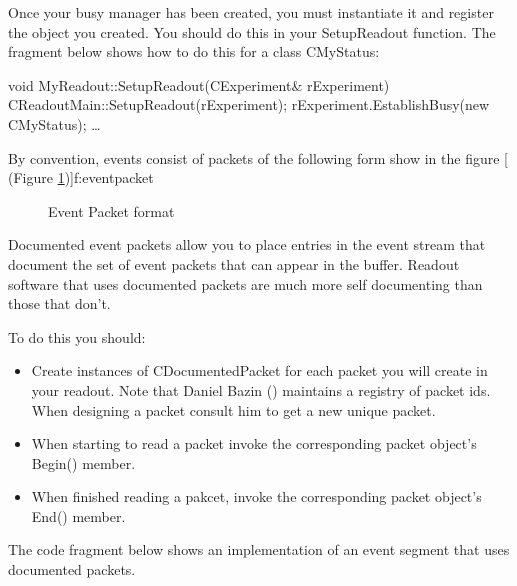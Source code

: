       Once your busy manager has been created, you must
      instantiate it and register the object you created.
      You should do this in your SetupReadout function.  The
      fragment below shows how to do this for a class
      CMyStatus:
      \begin{example}
      void
      MyReadout::SetupReadout(CExperiment\& rExperiment)
      {
	 CReadoutMain::SetupReadout(rExperiment);
	 rExperiment.EstablishBusy(new CMyStatus);
	 \ldots
      }
      \end{example}
 
      By convention, events consist of packets of the following
      form show in the figure 
      [
	 (Figure \ref{f:eventpacket})]{f:eventpacket}
	 
      \begin{figure}[htb]
	 \caption{Event Packet format}\label{f:eventpacket}
      \end{figure}
      
      Documented event packets allow you to place entries in
      the event stream that document the set of event packets
      that can appear in the buffer.  Readout software that uses
      documented packets are much more self documenting than those
      that don't.
      
      To do this you should:
      
      \begin{itemize}
	 \item Create instances of CDocumentedPacket for
	    each packet you will create in your readout.  Note
	    that Daniel Bazin 
	    ()
	    maintains a registry of packet ids. When designing a
	    packet consult him to get a new unique packet.
	 \item When starting to read a packet invoke the
	    corresponding packet object's Begin() member.
	 \item When finished reading a pakcet, invoke the
	    corresponding packet object's End() member.
      \end{itemize}
      
      The code fragment below shows an implementation of
      an event segment that uses documented packets.
      
